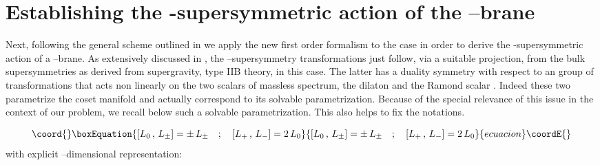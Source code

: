 \documentclass[a4paper,11pt]{article}
\begin{document}
\section{Establishing the \myHighlight{$\kappa$}\coordHE{}-supersymmetric action of the \coordHE{}--brane}
\label{thed3examp}
Next, following the general scheme outlined in \cite{noidued3} we apply
the new first order formalism  to the case \coordHE{} in order to derive the \myHighlight{$\kappa$}\coordHE{}-supersymmetric
action of a \coordHE{}--brane. As extensively discussed in \cite{noidued3},
the \myHighlight{$\kappa$}\coordHE{}--supersymmetry transformations just follow, via a suitable projection, from
the bulk supersymmetries as derived from supergravity, type IIB
theory, in this case. The latter has a duality symmetry with respect
to an \coordHE{} group of transformations that acts
non linearly on the two scalars of massless spectrum, the dilaton \myHighlight{$\phi$}\coordHE{} and
the Ramond scalar \coordHE{}. Indeed these two parametrize the coset
manifold \coordHE{} and actually
correspond to its solvable parametrization. Because of the special
relevance of this issue in the context of our problem, we recall below
such a solvable parametrization. This also helps to fix the notations.
\par
{}
\begin{equation}\coord{}\boxEquation{
  \left[ L_0 \, , \, L_\pm \right] = \pm \, L_\pm \quad ; \quad \left[ L_+ \, , \, L_- \right] = 2 \,
  L_0
\label{sl2alg}
}{
  \left[ L_0 \, , \, L_\pm \right] = \pm \, L_\pm \quad ; \quad \left[ L_+ \, , \, L_- \right] = 2 \,
  L_0
}{ecuacion}\coordE{}\end{equation}
with explicit \coordHE{}--dimensional representation:
\end{document}
